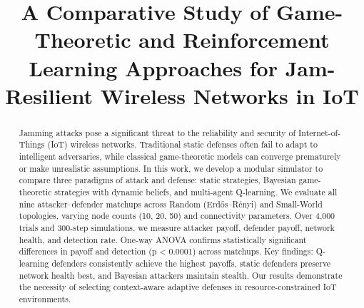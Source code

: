 \documentclass[conference]{IEEEtran}
\begin{document}
\title{A Comparative Study of Game-Theoretic and Reinforcement Learning Approaches for Jam-Resilient Wireless Networks in IoT}

\author{
  \and
  \and
}

\maketitle

\begin{abstract}
Jamming attacks pose a significant threat to the reliability and security of Internet-of-Things (IoT) wireless networks. Traditional static defenses often fail to adapt to intelligent adversaries, while classical game-theoretic models can converge prematurely or make unrealistic assumptions. In this work, we develop a modular simulator to compare three paradigms of attack and defense: static strategies, Bayesian game-theoretic strategies with dynamic beliefs, and multi-agent Q-learning. We evaluate all nine attacker–defender matchups across Random (Erdős–Rényi) and Small-World topologies, varying node counts (10, 20, 50) and connectivity parameters. Over 4,000 trials and 300-step simulations, we measure attacker payoff, defender payoff, network health, and detection rate. One-way ANOVA confirms statistically significant differences in payoff and detection (p < 0.0001) across matchups. Key findings: Q-learning defenders consistently achieve the highest payoffs, static defenders preserve network health best, and Bayesian attackers maintain stealth. Our results demonstrate the necessity of selecting context-aware adaptive defenses in resource-constrained IoT environments.
\end{abstract}
\end{document}
